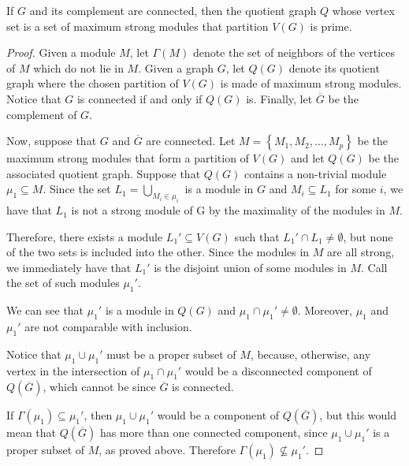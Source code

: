 \documentclass{article}
\begin{document}
    \begin{prop} \label{prime quotient}
        If $G$ and its complement are connected, 
        then the quotient graph  $Q$ whose vertex set is
        a set of maximum strong modules that partition $V\left(G\right)$ is prime.
    \end{prop}
    \begin{proof}
        Given a module $M$, let $\Gamma\left(M\right)$ denote
        the set of neighbors of the vertices of $M$ 
        which do not lie in $M$.
        Given a graph  $G$, let  $Q\left(G\right)$ denote
        its quotient graph  where the chosen partition of
        $V\left(G\right)$ is made of maximum strong modules.
        Notice that $G$ is connected if and only if $Q\left(G\right)$ is.
        Finally, let $\overline{G}$ be the complement of $G$.

        Now, suppose that $G$ and $\overline{G}$ are connected.
        Let $M = \left\{M_1, M_2, \ldots, M_{p}\right\}$
        be the maximum strong modules that form a partition of $V\left(G\right)$
        and let $Q\left(G\right)$ be the associated quotient graph.
        Suppose that $Q\left(G\right)$ contains a non-trivial module
        $\mu_1 \subseteq M$. Since the set $L_1 = \bigcup_{M_{i} \in \mu_{i}}$
        is a module in $G$ and $M_{i} \subseteq L_1$ for some $i$,
        we have that $L_1$ is not a strong module of G
        by the maximality of the modules in $M$.

        Therefore, there exists a module $L_1' \subseteq V\left(G\right)$
        such that $L_1' \cap L_1 \neq \emptyset$, 
        but none of the two sets is included into the other.
        Since the modules in $M$ are all strong,
        we immediately have that $L_1'$ is the disjoint union of some modules in $M$.
        Call the set of such modules $\mu_1'$.

        We can see that $\mu_1'$ is a module in $Q\left(G\right)$ and 
        $\mu_1 \cap \mu_1' \neq \emptyset$.
        Moreover, $\mu_1$ and $\mu_1'$ are not comparable with inclusion.

        Notice that $\mu_1 \cup \mu_1'$ must be a proper subset of $M$,
        because, otherwise, any vertex in the intersection of
        $\mu_1 \cap \mu_1'$ would be a disconnected component of 
        $Q\left(\overline{G}\right)$,  which cannot be since 
        $\overline{G}$ is connected.

        If $\Gamma\left(\mu_1\right) \subseteq \mu_1'$, then $\mu_1 \cup \mu_1'$ 
        would be a component of $Q\left(\overline{G}\right)$,
        but this would mean that $Q\left(\overline{G}\right)$
        has more than one connected component,
        since $\mu_1 \cup \mu_1'$ is a proper subset
        of $M$, as proved above. Therefore $\Gamma\left(\mu_1\right) \not \subseteq \mu_1'$.


\end{proof}
\end{document}
